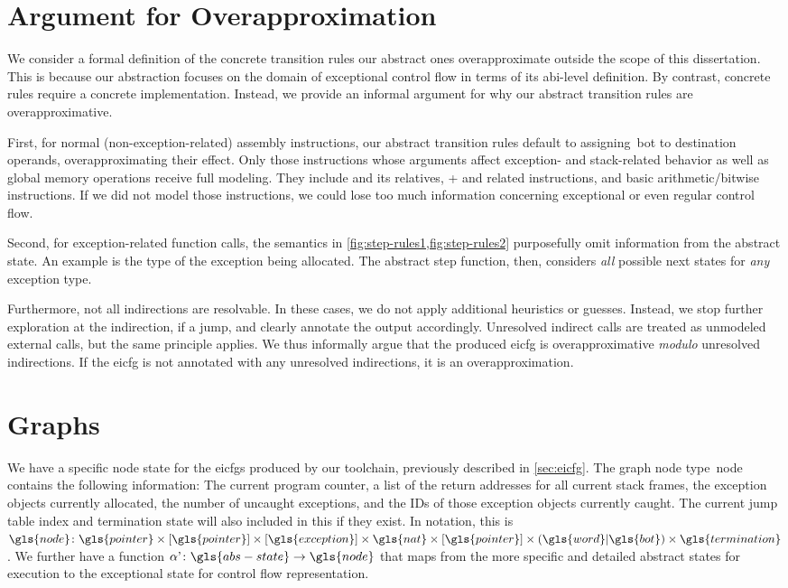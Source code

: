 \section{Argument for Overapproximation}
We consider a formal definition of the concrete transition rules our abstract ones overapproximate outside the scope of this dissertation.
This is because our abstraction focuses on the domain of exceptional control flow in terms of its \ac{abi}-level definition. By contrast, concrete rules require a concrete implementation.
Instead, we provide an informal argument for why our abstract transition rules are overapproximative.

First, for normal (non-exception-related) assembly instructions, our abstract transition rules default to assigning~\gls{bot} to destination operands, overapproximating their effect.
Only those instructions whose arguments affect exception- and stack-related behavior as well as global memory operations receive full modeling.
They include  and its relatives, + and related instructions, and basic arithmetic/bitwise instructions.
If we did not model those instructions, we could lose too much information concerning exceptional or even regular control flow.

Second, for exception-related function calls, the semantics in \cref{fig:step-rules1,fig:step-rules2} purposefully omit information from the abstract state.
An example is the type of the exception being allocated.
The abstract step function, then, considers \emph{all} possible next states for \emph{any} exception type.

Furthermore, not all indirections are resolvable.
In these cases, we do not apply additional heuristics or guesses.
Instead, we stop further exploration at the indirection, if a jump, and clearly annotate the output accordingly.
Unresolved indirect calls are treated as unmodeled external calls, but the same principle applies.
We thus informally argue that the produced \ac{eicfg} is overapproximative \emph{modulo} unresolved indirections.
If the \ac{eicfg} is not annotated with any unresolved indirections, it is an overapproximation.

\section{Graphs}
We have a specific node state for the \acp{eicfg} produced by our toolchain,
previously described in \cref{sec:eicfg}.
The graph node type~\gls{node} contains the following information:
The current program counter,
a list of the return addresses for all current stack frames,
the exception objects currently allocated,
the number of uncaught exceptions,
and the IDs of those exception objects currently caught.
The current jump table index and termination state will also included in this if they exist. In notation, this is
$\gls{node}\colon\gls{pointer}\times[\gls{pointer}]\times[\gls{exception}]\times\gls{nat}\times[\gls{pointer}]\times(\gls{word}|\gls{bot})\times\gls{termination}$.
We further have a function $\stateToNode\colon\gls{abs-state}\rightarrow\gls{node}$
that maps from the more specific and detailed abstract states for execution
to the exceptional state for control flow representation.

